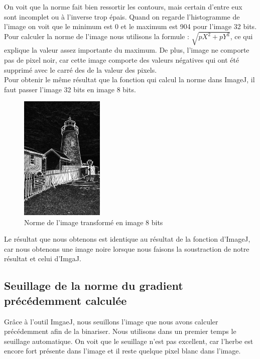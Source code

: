 \documentclass[a4paper,11pt]{article}
\begin{document}
  On voit que la norme fait bien ressortir les contours, mais certain d'entre eux sont incomplet
  ou à l'inverse trop épais. Quand on regarde l'histogramme de l'image on voit que le minimum est 0
  et le maximum est 904 pour l'image 32 bits. Pour calculer la norme de l'image nous utilisons 
  la formule : $\sqrt{pX^2 + pY^2}$, ce qui explique la valeur assez importante du maximum. De plus,
  l'image ne comporte pas de pixel noir, car cette image comporte des valeurs négatives qui ont 
  été supprimé avec le carré des de la valeur des pixels.\\
  
  Pour obtenir le même résultat que la fonction qui calcul la norme dans ImageJ, il faut passer 
  l'image 32 bits en image 8 bits.\\
  
  \begin{figure}[H]
  \center
   \includegraphics[width=4cm]{../norme8.png}
   \caption{Norme de l'image transformé en image 8 bits}
  \end{figure}
  
  Le résultat que nous obtenons est identique au résultat de la fonction d'ImageJ, car nous obtenons
  une image noire lorsque nous faisons la soustraction de notre résultat et celui d'ImgaJ.
  
  \subsection{Seuillage de la norme du gradient précédemment calculée}
  Grâce à l'outil ImgaeJ, nous seuillons l'image que nous avons calculer précédemment afin de la binariser.
  Nous utilisons dans un premier temps le seuillage automatique. On voit que le seuillage n'est pas excellent,
  car l'herbe est encore fort présente dans l'image et il reste quelque pixel blanc dans l'image.\\
  
\end{document}
